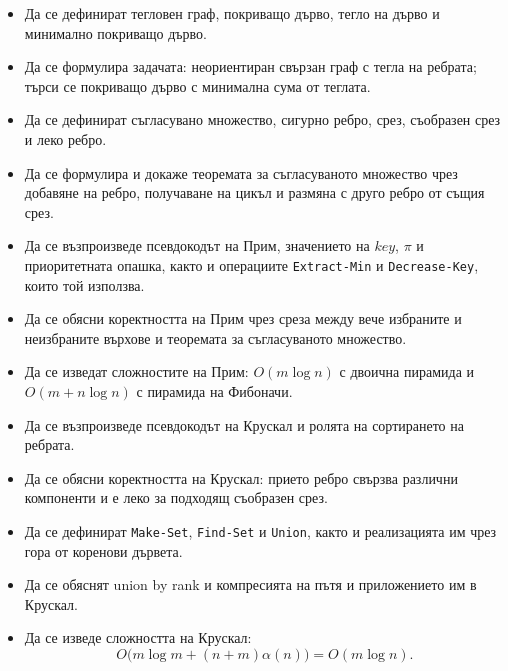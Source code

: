 \begin{itemize}
\item Да се дефинират тегловен граф, покриващо дърво, тегло на дърво и минимално покриващо дърво.
\item Да се формулира задачата: неориентиран свързан граф с тегла на ребрата; търси се покриващо дърво с минимална сума от теглата.
\item Да се дефинират съгласувано множество, сигурно ребро, срез, съобразен срез и леко ребро.
\item Да се формулира и докаже теоремата за съгласуваното множество чрез добавяне на ребро, получаване на цикъл и размяна с друго ребро от същия срез.
\item Да се възпроизведе псевдокодът на Прим, значението на $key$, $\pi$ и приоритетната опашка, както и операциите \verb|Extract-Min| и \verb|Decrease-Key|, които той използва.
\item Да се обясни коректността на Прим чрез среза между вече избраните и неизбраните върхове и теоремата за съгласуваното множество.
\item Да се изведат сложностите на Прим: $O(m\log n)$ с двоична пирамида и $O(m+n\log n)$ с пирамида на Фибоначи.
\item Да се възпроизведе псевдокодът на Крускал и ролята на сортирането на ребрата.
\item Да се обясни коректността на Крускал: прието ребро свързва различни компоненти и е леко за подходящ съобразен срез.
\item Да се дефинират \verb|Make-Set|, \verb|Find-Set| и \verb|Union|, както и реализацията им чрез гора от коренови дървета.
\item Да се обяснят union by rank и компресията на пътя и приложението им в Крускал.
\item Да се изведе сложността на Крускал:
\[
O\bigl(m\log m+(n+m)\alpha(n)\bigr)=O(m\log n).
\]
\end{itemize}
